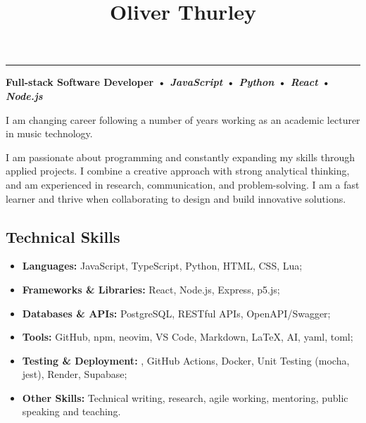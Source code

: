 \documentclass[10pt,a4paper]{article}
\title{{\huge Oliver Thurley}{\raggedright}}
\author{}
\date{}
\makeatletter
\renewcommand{\maketitle}{\bgroup\setlength{\parindent}{0pt}
\begin{flushleft}
  \normalfont{\@title}
  \@author
\end{flushleft}\egroup
}
\providecommand{\tightlist}{%
  \setlength{\itemsep}{0pt}\setlength{\parskip}{0pt}}
\makeatother
\begin{document}
\maketitle

\vspace{0.5em}
\noindent\href{mailto:o.thrly@gmail.com}{} \hfill
{} \hfill
\href{https://thrly.com}{} \hfill
\href{https://github.com/thrly}{} \hfill
\href{https://linkedin.com/in/oliver-thurley}{}

\vspace{0.75em}
\noindent\rule{\textwidth}{0.5pt}

\textbf{Full-stack Software Developer • \emph{JavaScript} •
\emph{Python} • \emph{React} • \emph{Node.js}}

I am changing career following a number of years working as an academic
lecturer in music technology.

I am passionate about programming and constantly expanding my skills
through applied projects. I combine a creative approach with strong
analytical thinking, and am experienced in research, communication, and
problem-solving. I am a fast learner and thrive when collaborating to
design and build innovative solutions.

\subsection{Technical Skills}\label{technical-skills}

\begin{itemize}
\tightlist
\item
  \textbf{Languages:} JavaScript, TypeScript, Python, HTML, CSS, Lua;
\item
  \textbf{Frameworks \& Libraries:} React, Node.js, Express, p5.js;
\item
  \textbf{Databases \& APIs:} PostgreSQL, RESTful APIs, OpenAPI/Swagger;
\item
  \textbf{Tools:} GitHub, npm, neovim, VS Code, Markdown, LaTeX, AI,
  yaml, toml;
\item
  \textbf{Testing \& Deployment:} , GitHub Actions, Docker, Unit Testing
  (mocha, jest), Render, Supabase;
\item
  \textbf{Other Skills:} Technical writing, research, agile working,
  mentoring, public speaking and teaching.
\end{itemize}
\end{document}
